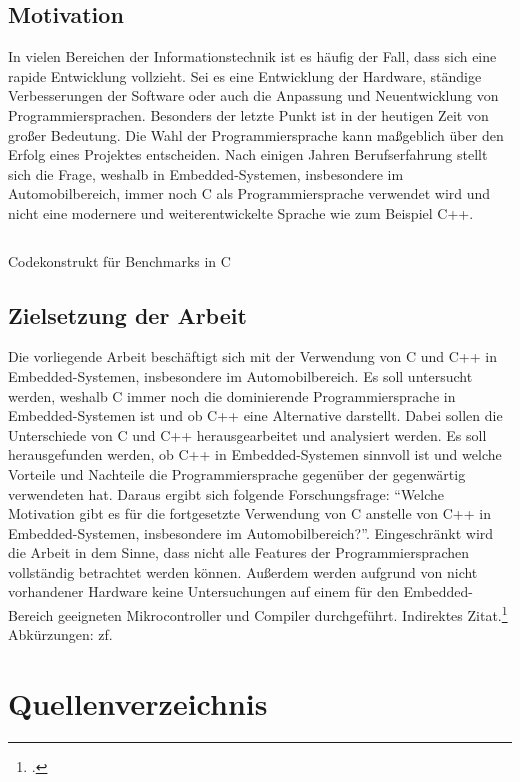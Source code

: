 \documentclass[11pt, a4paper]{article}
\begin{document}
    \subsection{Motivation}
    In vielen Bereichen der Informationstechnik ist es häufig der Fall, dass sich eine rapide Entwicklung vollzieht. Sei es eine Entwicklung der Hardware, ständige Verbesserungen der Software oder auch die Anpassung und Neuentwicklung von Programmiersprachen. Besonders der letzte Punkt ist in der heutigen Zeit von großer Bedeutung. Die Wahl der Programmiersprache kann maßgeblich über den Erfolg eines Projektes entscheiden.\newlineindent
    Nach einigen Jahren Berufserfahrung stellt sich die Frage, weshalb in Embedded\--Sys\-te\-men, insbesondere im Automobilbereich, immer noch C als Programmiersprache verwendet wird und nicht eine modernere und weiterentwickelte Sprache wie zum Beispiel C++.
    \begin{listing}[!ht]
        \inputminted{cpp}{code/c-benchmark-setup.c}
        \caption{Codekonstrukt für Benchmarks in C}
        \label{listing:1}
    \end{listing}
    \subsection{Zielsetzung der Arbeit}
    Die vorliegende Arbeit beschäftigt sich mit der Verwendung von C und C++ in Embedded-Systemen, insbesondere im Automobilbereich. Es soll untersucht werden, weshalb C immer noch die dominierende Programmiersprache in Embedded-Systemen ist und ob C++ eine Alternative darstellt. Dabei sollen die Unterschiede von C und C++ herausgearbeitet und analysiert werden. Es soll herausgefunden werden, ob C++ in Embedded\allowbreak -Systemen sinnvoll ist und welche Vorteile und Nachteile die Programmiersprache gegenüber der gegenwärtig verwendeten hat.\newlineindent
    Daraus ergibt sich folgende Forschungsfrage: "`Welche Motivation gibt es für die fortgesetzte Verwendung von C anstelle von C++ in Embedded-Systemen, insbesondere im Automobilbereich?"'.\newlineindent
    Eingeschränkt wird die Arbeit in dem Sinne, dass nicht alle Features der Programmiersprachen vollständig betrachtet werden können. Außerdem werden aufgrund von nicht vorhandener Hardware keine Untersuchungen auf einem für den Embedded-Bereich geeigneten Mikrocontroller und Compiler durchgeführt. Indirektes Zitat.\footcite[Vgl.][S. 1]{Jimenez.2014} Abkürzungen: \ac{zf}.

    \cleardoublepage

    \section*{Quellenverzeichnis}
\end{document}
